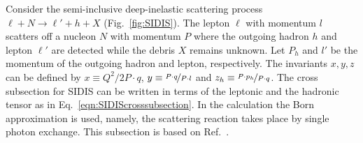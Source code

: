 Consider the semi-inclusive deep-inelastic scattering process $\ell+N \rightarrow \ell'+h+X$ (Fig.~\ref{fig:SIDIS}). The lepton $\ell$ with momentum $l$ scatters off a nucleon $N$ with momentum $P$ where the outgoing hadron $h$ and lepton $\ell'$ are detected while the debris $X$ remains unknown. Let $P_h$ and $l'$ be the momentum of the outgoing hadron and lepton, respectively. The invariants $x,y,z$ can be defined by $x \equiv Q^2/2P \cdot q$, $y \equiv \nicefrac{P\cdot q}{P \cdot l}$ and $z_h \equiv \nicefrac{P\cdot p_h}{P \cdot q}$. The cross subsection for SIDIS can be written in terms of the leptonic and the hadronic tensor as in Eq.~\ref{eqn:SIDIScrosssubsection}. In the calculation the Born approximation is used, namely, the scattering reaction takes place by single photon exchange. This subsection is based on Ref.~\cite{Boer:2003cm, AsyInPolarizedHadronProductionInEE,AsymmetryInEE,CompleteTreeLevel,TransversePN}.

